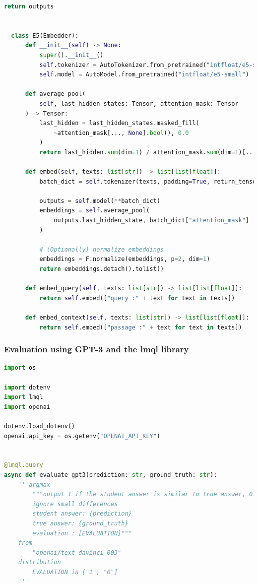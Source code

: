 \documentclass[a4paper,12pt]{article}
\begin{document}
\begin{lstlisting}[language=Python]
          return outputs
  
  
  class E5(Embedder):
      def __init__(self) -> None:
          super().__init__()
          self.tokenizer = AutoTokenizer.from_pretrained("intfloat/e5-small")
          self.model = AutoModel.from_pretrained("intfloat/e5-small")
  
      def average_pool(
          self, last_hidden_states: Tensor, attention_mask: Tensor
      ) -> Tensor:
          last_hidden = last_hidden_states.masked_fill(
              ~attention_mask[..., None].bool(), 0.0
          )
          return last_hidden.sum(dim=1) / attention_mask.sum(dim=1)[..., None]
  
      def embed(self, texts: list[str]) -> list[list[float]]:
          batch_dict = self.tokenizer(texts, padding=True, return_tensors="pt")
  
          outputs = self.model(**batch_dict)
          embeddings = self.average_pool(
              outputs.last_hidden_state, batch_dict["attention_mask"]
          )
  
          # (Optionally) normalize embeddings
          embeddings = F.normalize(embeddings, p=2, dim=1)
          return embeddings.detach().tolist()
  
      def embed_query(self, texts: list[str]) -> list[list[float]]:
          return self.embed(["query :" + text for text in texts])
  
      def embed_context(self, texts: list[str]) -> list[list[float]]:
          return self.embed(["passage :" + text for text in texts])
\end{lstlisting}

\subsubsection*{Evaluation using GPT-3 \cite{gpt3} and the lmql library \cite{lmql}}
\begin{lstlisting}[language=Python]
import os

import dotenv
import lmql
import openai

dotenv.load_dotenv()
openai.api_key = os.getenv("OPENAI_API_KEY")


@lmql.query
async def evaluate_gpt3(prediction: str, ground_truth: str):
    '''argmax
        """output 1 if the student answer is similar to true answer, 0 otherwise
        ignore small differences
        student answer: {prediction}
        true answer: {ground_truth}
        evaluation : [EVALUATION]"""
    from
        "openai/text-davinci-003"
    distribution
        EVALUATION in ["1", "0"]
    '''  
\end{lstlisting}
\end{document}
